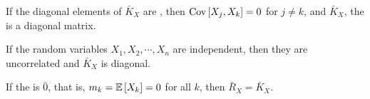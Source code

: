 \begin{definition}
\begin{remark}
			\end{remark}
			\begin{remark}
				If the diagonal elements of $\bar{K}_{X}$ are , then $\operatorname{\operatorname{Cov}} \left[ X_{j}, X_{k} \right] = 0$ for $j \neq k$, and $\bar{K}_{X}$, the  is a diagonal matrix.
			\end{remark}
			\begin{remark}
				If the random variables $X_{1},X_{2},\cdots,X_{n}$ are independent, then they are uncorrelated and $\bar{K}_{X}$ is diagonal.
			\end{remark}
			\begin{remark}
				If the  is $\bar{0}$, that is, $m_{k} = \operatorname{\operatorname{\mathbb{E}}} \left[ X_{k} \right] = 0$ for all $k$, then $\bar{R}_{X} = \bar{K}_{X}$.
			\end{remark}
		\end{definition}